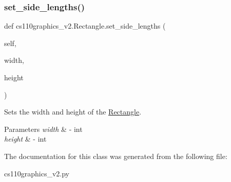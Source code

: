 \subsubsection{\texorpdfstring{set\_side\_lengths()}{set\_side\_lengths()}}
{\footnotesize\ttfamily def cs110graphics\+\_\+v2.\+Rectangle.\+set\+\_\+side\+\_\+lengths (\begin{DoxyParamCaption}\item[{}]{self,  }\item[{}]{width,  }\item[{}]{height }\end{DoxyParamCaption})}



Sets the width and height of the \mbox{\hyperlink{classcs110graphics__v2_1_1Rectangle}{Rectangle}}. 


\begin{DoxyParams}{Parameters}
{\em width} & -\/ int \\
\hline
{\em height} & -\/ int \\
\hline
\end{DoxyParams}


The documentation for this class was generated from the following file\+:\begin{DoxyCompactItemize}
\item 
cs110graphics\+\_\+v2.\+py\end{DoxyCompactItemize}
